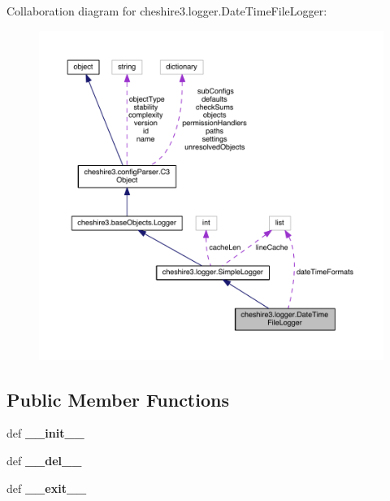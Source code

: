 Collaboration diagram for cheshire3.\-logger.\-Date\-Time\-File\-Logger\-:
\nopagebreak
\begin{figure}[H]
\begin{center}
\leavevmode
\includegraphics[width=350pt]{classcheshire3_1_1logger_1_1_date_time_file_logger__coll__graph}
\end{center}
\end{figure}
\subsection*{Public Member Functions}
\begin{DoxyCompactItemize}
\item 
\hypertarget{classcheshire3_1_1logger_1_1_date_time_file_logger_a5bf77ece9f382cca355c66703d2ae7ed}{def {\bfseries \-\_\-\-\_\-init\-\_\-\-\_\-}}\label{classcheshire3_1_1logger_1_1_date_time_file_logger_a5bf77ece9f382cca355c66703d2ae7ed}

\item 
\hypertarget{classcheshire3_1_1logger_1_1_date_time_file_logger_a839e3d4e938ca43807094fb6b84cb2e7}{def {\bfseries \-\_\-\-\_\-del\-\_\-\-\_\-}}\label{classcheshire3_1_1logger_1_1_date_time_file_logger_a839e3d4e938ca43807094fb6b84cb2e7}

\item 
\hypertarget{classcheshire3_1_1logger_1_1_date_time_file_logger_a7d0ab99aa8390c063eb59734785005cb}{def {\bfseries \-\_\-\-\_\-exit\-\_\-\-\_\-}}\label{classcheshire3_1_1logger_1_1_date_time_file_logger_a7d0ab99aa8390c063eb59734785005cb}

\end{DoxyCompactItemize}
